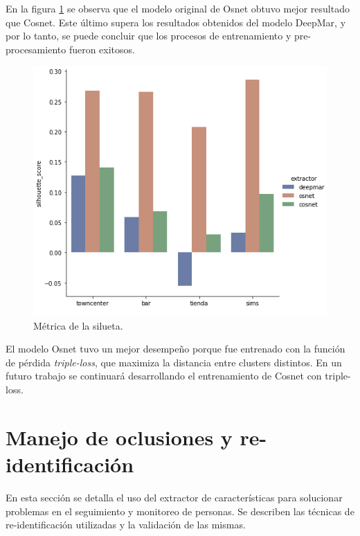 \newpage

En la figura \ref{fig:comparacionExtractores} se observa que el modelo original de Osnet obtuvo mejor resultado que Cosnet. Este último supera los resultados obtenidos del modelo DeepMar, y por lo tanto, se puede concluir que los procesos de entrenamiento y pre-procesamiento fueron exitosos.

\begin{figure}[ht]
	\centering
	\includegraphics[scale=1.]{./Figures/comparacionExtractores.png}
	\caption{Métrica de la silueta.}
	\label{fig:comparacionExtractores}
\end{figure}

El modelo Osnet tuvo un mejor desempeño porque fue entrenado con la función de pérdida \textit{triple-loss}, que maximiza la distancia entre clusters distintos. En un futuro trabajo se continuará desarrollando el entrenamiento de Cosnet con triple-loss.

\newpage


\section{Manejo de oclusiones y re-identificación}
\label{sec:oclusionesReID}

En esta sección se detalla el uso del extractor de características para solucionar problemas en el seguimiento y monitoreo de personas. Se describen las técnicas de re-identificación utilizadas y la validación de las mismas.

